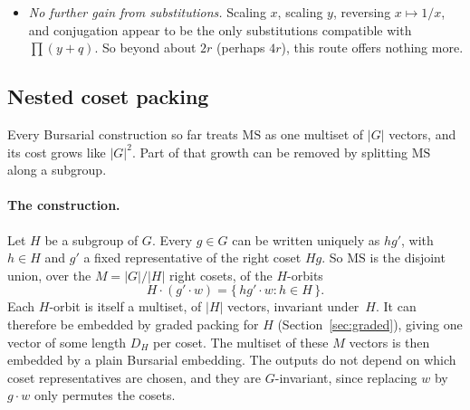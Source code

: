 \documentclass[11pt]{article}
\theoremstyle{definition}
\theoremstyle{remark}
\newcommand{\MS}{\mathrm{MS}}
\begin{document}
\begin{itemize}
    Why such zeros occur is illustrated by $E_{5,42}$ for
    $S(3)\times S(2)\times P$, $k = 4$, in the layout without shift (positions
    congruent to weights). It shows a cancellation that the character
    argument above cannot see. Only positions 8 and 9 contribute, with
    $z_9 = 2\sum_i (d_{ip} - d_{iq})$ and $z_8$ the weight-2 combination
    $2[(d_{ap}+d_{aq}) + \omega (d_{bp}+d_{bq}) + \omega^2 (d_{cp}+d_{cq})]$,
    $\omega = e^{-2\pi i/3}$. For $g = (\sigma,\tau) \in S(3)\times S(2)$,
    $z_9(g) = \pm u$ depends only on $\tau$, and $z_8(g) = \beta_\sigma$ only
    on $\sigma$, taking the values $\omega^k\beta$ ($\sigma$ even) and
    $\omega^k\gamma$ ($\sigma$ odd). Then $E_{5,42}$ is the coefficient of
    $s^2t^3$ in
    \[
      \prod_g \bigl(1 + s z_9(g) + t z_8(g)\bigr)
      = \prod_\sigma \bigl((1 + t\beta_\sigma)^2 - s^2u^2\bigr),
    \]
    namely $-u^2$ times the $t^3$ coefficient of
    $\prod_\sigma (1+t\beta_\sigma)^2 \cdot \sum_\sigma (1+t\beta_\sigma)^{-2}
    = \bigl(1 + 2t^3(\beta^3+\gamma^3) + \cdots\bigr)
      \bigl(6 - 12t^3(\beta^3+\gamma^3) + \cdots\bigr)$,
    which is $12(\beta^3+\gamma^3) - 12(\beta^3+\gamma^3) = 0$.
  \item \emph{No further gain from substitutions.} Scaling $x$, scaling $y$,
    reversing $x \mapsto 1/x$, and conjugation appear to be the only
    substitutions compatible with $\prod (y + q)$. So beyond about $2r$
    (perhaps $4r$), this route offers nothing more.
\end{itemize}

\subsection{Nested coset packing}\label{sec:nested}

Every Bursarial construction so far treats $\MS$ as one multiset of $|G|$
vectors, and its cost grows like $|G|^2$. Part of that growth can be removed by
splitting $\MS$ along a subgroup.

\paragraph{The construction.}
Let $H$ be a subgroup of $G$. Every $g \in G$ can be written uniquely as $hg'$,
with $h \in H$ and $g'$ a fixed representative of the right coset $Hg$. So $\MS$
is the disjoint union, over the $M = |G|/|H|$ right cosets, of the
$H$-orbits
\[
  H \cdot (g' \cdot w) = \{\, h g' \cdot w : h \in H \,\} .
\]
Each $H$-orbit is itself a multiset, of $|H|$ vectors, invariant under~$H$. It
can therefore be embedded by graded packing for $H$ (Section~\ref{sec:graded}),
giving one vector of some length $D_H$ per coset. The multiset of these $M$
vectors is then embedded by a plain Bursarial embedding. The outputs do not
depend on which coset representatives are chosen, and they are $G$-invariant,
since replacing $w$ by $g \cdot w$ only permutes the cosets.
\end{document}

